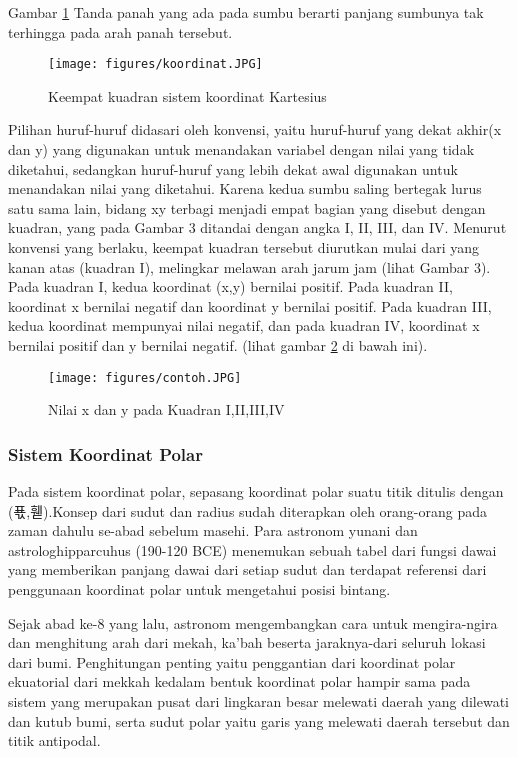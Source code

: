 Gambar \ref{koordinat} Tanda panah yang ada pada sumbu berarti panjang sumbunya tak terhingga pada arah panah tersebut.

\begin{figure}[ht]
    \centerline{\texttt{[image: figures/koordinat.JPG]}}
    \caption{Keempat kuadran sistem koordinat Kartesius}
    \label{koordinat}
    \end{figure}

Pilihan huruf-huruf didasari oleh konvensi, yaitu huruf-huruf yang dekat akhir(x dan y) yang digunakan untuk menandakan variabel dengan nilai yang tidak diketahui, sedangkan huruf-huruf yang lebih dekat awal digunakan untuk menandakan nilai yang diketahui. Karena kedua sumbu saling bertegak lurus satu sama lain, bidang xy terbagi menjadi empat bagian yang disebut dengan kuadran, yang pada Gambar 3 ditandai dengan angka I, II, III, dan IV. Menurut konvensi yang berlaku, keempat kuadran tersebut diurutkan mulai dari yang kanan atas (kuadran I), melingkar melawan arah jarum jam (lihat Gambar 3). Pada kuadran I, kedua koordinat (x,y) bernilai positif. Pada kuadran II, koordinat x bernilai negatif dan koordinat y bernilai positif. Pada kuadran III, kedua koordinat mempunyai nilai negatif, dan pada kuadran IV, koordinat x bernilai positif dan y bernilai negatif. (lihat gambar \ref{contoh} di bawah ini).

\begin{figure}[ht]
    \centerline{\texttt{[image: figures/contoh.JPG]}}
    \caption{Nilai x dan y pada Kuadran I,II,III,IV}
    \label{contoh}
    \end{figure}

\subsubsection{Sistem Koordinat Polar}

Pada sistem koordinat polar, sepasang koordinat polar suatu titik ditulis dengan (푟,휃)\cite{mufidah2015solusi}.Konsep dari sudut dan radius sudah diterapkan oleh orang-orang pada zaman dahulu se-abad sebelum masehi. Para astronom yunani dan astrologhipparcuhus (190-120 BCE) menemukan sebuah tabel dari fungsi dawai yang memberikan panjang dawai dari setiap sudut dan terdapat referensi dari penggunaan koordinat polar untuk mengetahui posisi bintang.


Sejak abad ke-8 yang lalu, astronom mengembangkan cara untuk mengira-ngira dan menghitung arah dari mekah, ka'bah beserta jaraknya-dari seluruh lokasi dari bumi. Penghitungan penting yaitu penggantian dari koordinat polar ekuatorial dari mekkah kedalam bentuk koordinat polar hampir sama pada sistem yang merupakan pusat dari lingkaran besar melewati daerah yang dilewati dan kutub bumi, serta sudut polar yaitu garis yang melewati daerah tersebut dan titik antipodal.

